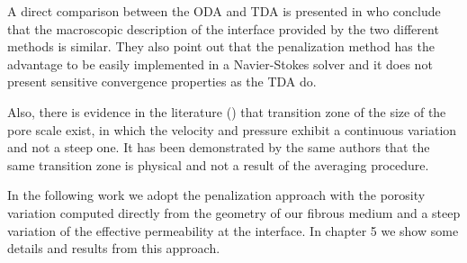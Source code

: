 A direct comparison between the ODA and TDA is presented in \citet{cimolin2013navier} who conclude that the macroscopic description of the interface provided by the two different methods is similar. They also point out that the penalization method has the advantage to be easily implemented in a Navier-Stokes solver and it does not present sensitive convergence properties as the TDA do.

Also, there is evidence in the literature (\citet{ochoa2017fluid}) that transition zone of the size of the pore scale exist, in which the velocity and pressure exhibit a continuous variation and not a steep one. It has been demonstrated by the same authors that the same transition zone is physical and not a result of the averaging procedure.

In the following work we adopt the penalization approach with the porosity variation computed directly from the geometry of our fibrous medium and a steep variation of the effective permeability at the interface. In chapter 5 we show some details and results from this approach.

